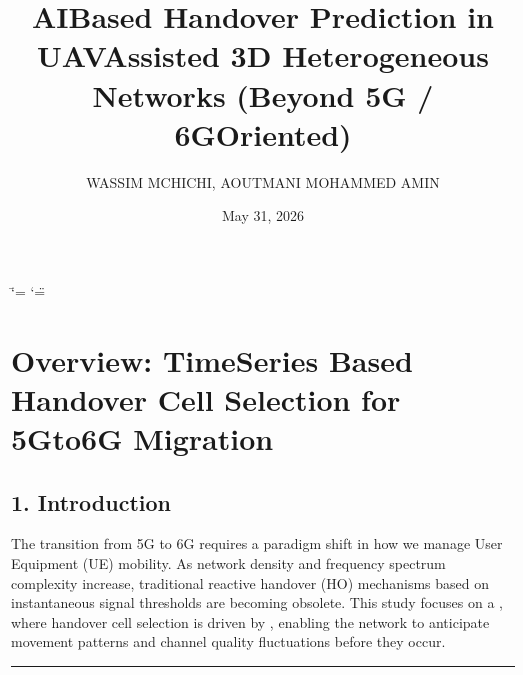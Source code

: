 \documentclass[letterpaper,10pt,english]{sphinxmanual}
\title{AI\sphinxhyphen{}Based Handover Prediction in UAV\sphinxhyphen{}Assisted 3D Heterogeneous Networks (Beyond 5G / 6G\sphinxhyphen{}Oriented)}
\date{May 31, 2026}
\author{WASSIM MCHICHI, AOUTMANI MOHAMMED AMIN}
\begin{document}
\ifdefined\shorthandoff
  \ifnum\catcode`\=\string=\active\shorthandoff{=}\fi
  \ifnum\catcode`\"=\active{}\fi
\fi

\pagestyle{empty}
\sphinxmaketitle
\pagestyle{plain}
\sphinxtableofcontents
\pagestyle{normal}
\label{\detokenize{index::doc}}


\sphinxstepscope


\chapter{Overview: Time\sphinxhyphen{}Series Based Handover Cell Selection for 5G\sphinxhyphen{}to\sphinxhyphen{}6G Migration}
\label{\detokenize{overview:overview-time-series-based-handover-cell-selection-for-5g-to-6g-migration}}\label{\detokenize{overview::doc}}

\section{1. Introduction}
\label{\detokenize{overview:introduction}}
\sphinxAtStartPar
The transition from 5G to 6G requires a paradigm shift in how we manage User Equipment (UE) mobility. As network density and frequency spectrum complexity increase, traditional reactive handover (HO) mechanisms based on instantaneous signal thresholds are becoming obsolete. This study focuses on a , where handover cell selection is driven by , enabling the network to anticipate movement patterns and channel quality fluctuations before they occur.


\bigskip\hrule\bigskip
\end{document}
